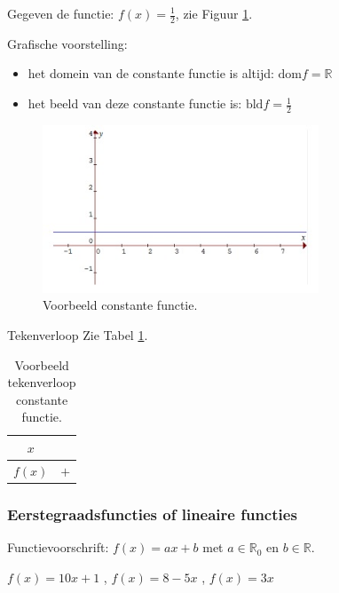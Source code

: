 \begin{voorbeeld}
	Gegeven de functie: $f(x)=\frac{1}{2}$, zie Figuur \ref{fig:ct}. 

Grafische voorstelling:
\begin{itemize}
\item het domein van de constante functie is altijd: $\textrm{dom}f=\mathbb{R}$
\item het beeld van deze constante functie is: $\textrm{bld}f=\frac{1}{2}$
\end{itemize}
\begin{figure}[h]
\centering{}\includegraphics[height=5cm]{2_elem_rekenvaardigheden_B/inputs/constantefuncties.jpg} 
\caption{Voorbeeld constante functie.}
\label{fig:ct}
\end{figure}

Tekenverloop
Zie Tabel \ref{tab:ct_vb}.
\begin{table}[h]
\centering
\begin{tabular}{c||c}
	$x$ & \\
	\hline 
	$f(x)$ & $+$ \\
\end{tabular}
\caption{Voorbeeld tekenverloop constante functie.}
\label{tab:ct_vb}
\end{table}

\end{voorbeeld}

\subsubsection{Eerstegraadsfuncties of lineaire functies}




\begin{definitie}
	Functievoorschrift: $f(x)=ax+b$ met $a\in\mathbb{R}_{0}$
en $b\in\mathbb{R}$.

\end{definitie}


\begin{voorbeeld}
	 $f(x)=10x+1$ , $f(x)=8-5x$ , $f(x)=3x$
\end{voorbeeld}

